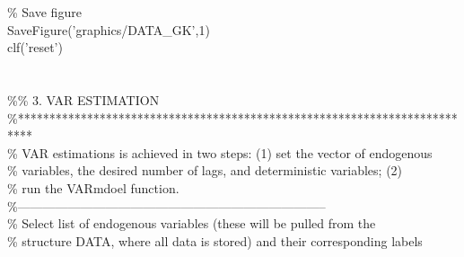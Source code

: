 \hspace{1mm}\hspace{5mm} \textcolor{matlabgreen}{\% Save figure }\\ 
\hspace{1mm}\hspace{5mm} SaveFigure(\textcolor{matlabpurple}{'graphics/DATA\_GK'},1) \\ 
\hspace{1mm}\hspace{5mm} clf(\textcolor{matlabpurple}{'reset'}) \\ 
\hspace{1mm}\hspace{5mm}  \\ 
\hspace{1mm}\hspace{5mm}  \\ 
\hspace{1mm}\hspace{5mm} \textcolor{matlabgreen}{\%}\textcolor{matlabgreen}{\% 3. VAR ESTIMATION }\\ 
\hspace{1mm}\hspace{5mm} \textcolor{matlabgreen}{\%**************************************************************************  }\\ 
\hspace{1mm}\hspace{5mm} \textcolor{matlabgreen}{\% VAR estimations is achieved in two steps: (1) set the vector of endogenous  }\\ 
\hspace{1mm}\hspace{5mm} \textcolor{matlabgreen}{\% variables, the desired number of lags, and deterministic variables; (2) }\\ 
\hspace{1mm}\hspace{5mm} \textcolor{matlabgreen}{\% run the VARmdoel function. }\\ 
\hspace{1mm}\hspace{5mm} \textcolor{matlabgreen}{\%--------------------------------------------------------------------------  }\\ 
\hspace{1mm}\hspace{5mm} \textcolor{matlabgreen}{\% Select list of endogenous variables (these will be pulled from the  }\\ 
\hspace{1mm}\hspace{5mm} \textcolor{matlabgreen}{\% structure DATA, where all data is stored) and their corresponding labels  }\\ 
